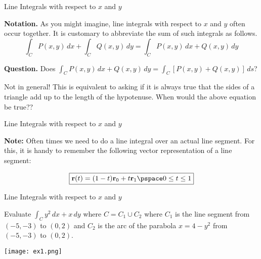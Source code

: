 \documentclass[11pt,english,
handout
]{beamer}
\begin{document}
\begin{frame}{Line Integrals with respect to $x$ and $y$}
\small 

\textbf{Notation.} As you might imagine, line integrals with respect to $x$ and $y$ often occur together. It is customary to abbreviate the sum of such integrals as follows.
\[
\int_CP(x,y)\,dx+\int_CQ(x,y)\,dy=\int_CP(x,y)\,dx+Q(x,y)\,dy
\]\pause 

\lspace
\textbf{Question.} Does $\displaystyle \int_CP(x,y)\,dx+Q(x,y)\,dy=\int_C[P(x,y)+Q(x,y)]\,ds$?\pause 

\lspace
Not in general! \pause This is equivalent to asking if it is always true that the sides of a triangle add up to the length of the hypotenuse. When would the above equation be true?? %
\end{frame}








\begin{frame}{Line Integrals with respect to $x$ and $y$}

\textbf{Note:} Often times we need to do a line integral over an actual line segment. For this, it is handy to remember the following vector representation of a line segment:

\[
\boxed{\mathbf{r}(t)=(1-t)\mathbf{r}_0+t\mathbf{r}_1\pspace0\leq t\leq 1}
\]
\end{frame}









\begin{frame}[t]{Line Integrals with respect to $x$ and $y$}
\small 
\begin{example}
Evaluate $\displaystyle \int_Cy^2\,dx+x\,dy$ where $C=C_1\cup C_2$ where $C_1$ is the line segment from $(-5,-3)$ to $(0,2)$ and $C_2$ is the arc of the parabola $x=4-y^2$ from $(-5,-3)$ to $(0,2)$.\pause 

\begin{center}
\texttt{[image: ex1.png]}
\end{center}
\end{example}
\end{frame}
\end{document}
